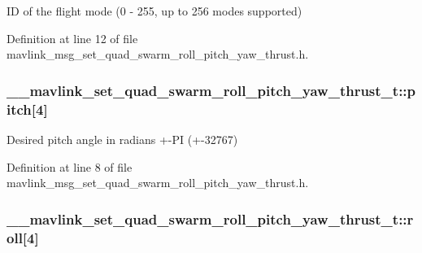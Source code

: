 I\-D of the flight mode (0 -\/ 255, up to 256 modes supported) 



Definition at line 12 of file mavlink\-\_\-msg\-\_\-set\-\_\-quad\-\_\-swarm\-\_\-roll\-\_\-pitch\-\_\-yaw\-\_\-thrust.\-h.

\hypertarget{struct____mavlink__set__quad__swarm__roll__pitch__yaw__thrust__t_a6e84b733aa9481afc75bea48377b3a15}{
\subsubsection[{pitch}]{ \-\_\-\-\_\-mavlink\-\_\-set\-\_\-quad\-\_\-swarm\-\_\-roll\-\_\-pitch\-\_\-yaw\-\_\-thrust\-\_\-t\-::pitch\mbox{[}4\mbox{]}}}\label{struct____mavlink__set__quad__swarm__roll__pitch__yaw__thrust__t_a6e84b733aa9481afc75bea48377b3a15}


Desired pitch angle in radians +-\/\-P\-I (+-\/32767) 



Definition at line 8 of file mavlink\-\_\-msg\-\_\-set\-\_\-quad\-\_\-swarm\-\_\-roll\-\_\-pitch\-\_\-yaw\-\_\-thrust.\-h.

\hypertarget{struct____mavlink__set__quad__swarm__roll__pitch__yaw__thrust__t_af834f144fd399bca28dddcd4a51df62e}{
\subsubsection[{roll}]{ \-\_\-\-\_\-mavlink\-\_\-set\-\_\-quad\-\_\-swarm\-\_\-roll\-\_\-pitch\-\_\-yaw\-\_\-thrust\-\_\-t\-::roll\mbox{[}4\mbox{]}}}\label{struct____mavlink__set__quad__swarm__roll__pitch__yaw__thrust__t_af834f144fd399bca28dddcd4a51df62e}


